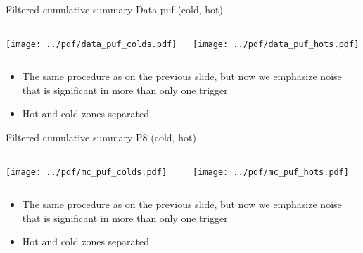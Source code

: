 \documentclass[9pt]{beamer}
\begin{document}
\begin{frame}[t]{Filtered cumulative summary Data puf (cold, hot)}
\begin{columns}[T]
  \begin{column}{.5\textwidth}
  \texttt{[image: ../pdf/data\_puf\_colds.pdf]}
  \end{column}
  \begin{column}{.5\textwidth}
  \texttt{[image: ../pdf/data\_puf\_hots.pdf]}
  \end{column}
\end{columns}
\begin{itemize}
 \item The same procedure as on the previous slide, but now we emphasize noise that is significant in more than only one trigger
 \item Hot and cold zones separated
\end{itemize}
\end{frame}

\begin{frame}[t]{Filtered cumulative summary P8 (cold, hot)}
\begin{columns}[T]
  \begin{column}{.5\textwidth}
  \texttt{[image: ../pdf/mc\_puf\_colds.pdf]}
  \end{column}
  \begin{column}{.5\textwidth}
  \texttt{[image: ../pdf/mc\_puf\_hots.pdf]}
  \end{column}
\end{columns}
\begin{itemize}
 \item The same procedure as on the previous slide, but now we emphasize noise that is significant in more than only one trigger
 \item Hot and cold zones separated
\end{itemize}
\end{frame}
\end{document}
